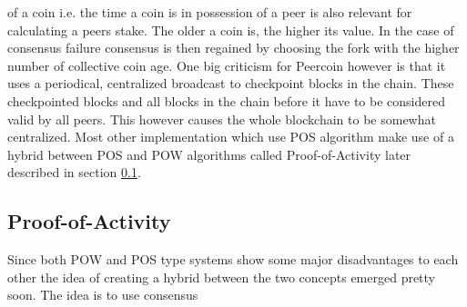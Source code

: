 of a coin i.e. the time a coin is in possession of a peer is also relevant for calculating a peers stake. The older a coin is, the higher its value. In the case of consensus failure consensus is then
regained by choosing the fork with the higher number of collective coin age.\cite{url:peercoin} One big criticism for Peercoin however is that it uses a periodical, centralized broadcast to checkpoint blocks in the chain.
These checkpointed blocks and all blocks in the chain before it have to be considered valid by all peers. This however causes the whole blockchain to be somewhat centralized.
Most other implementation which use POS algorithm make use of a hybrid between POS and POW algorithms called Proof-of-Activity later described in section \ref{poa}.

\subsection{Proof-of-Activity} \label{poa}

Since both POW and POS type systems show some major disadvantages to each other the idea of creating a hybrid between the two concepts emerged pretty soon. The idea is to use consensus 
